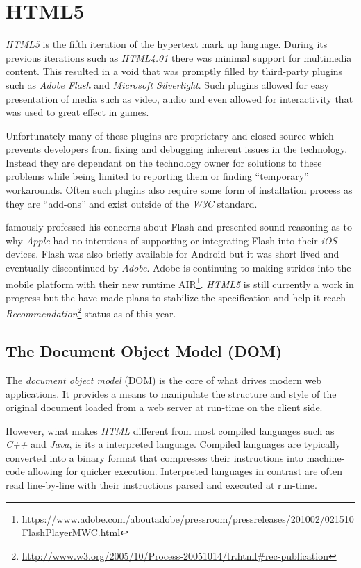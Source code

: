 \documentclass[final]{cmpreport}
\begin{document}
\section{HTML5}
\textit{HTML5} is the fifth iteration of the hypertext mark up language. During its previous iterations such as \textit{HTML4.01} there was minimal support for multimedia content. This resulted in a void that was promptly filled by third-party plugins such as \textit{Adobe Flash} and \textit{Microsoft Silverlight}. Such plugins allowed for easy presentation of media such as video, audio and even allowed for interactivity that was used to great effect in games.

Unfortunately many of these plugins are proprietary and closed-source which prevents developers from fixing and debugging inherent issues in the technology. Instead they are dependant on the technology owner for solutions to these problems while being limited to reporting them or finding ``temporary'' workarounds. Often such plugins also require some form of installation process as they are ``add-ons'' and exist outside of the \textit{W3C} standard. 

\citet{Jobs} famously professed his concerns about Flash and presented sound reasoning as to why \textit{Apple} had no intentions of supporting or integrating Flash into their \textit{iOS} devices. Flash was also briefly available for Android but it was short lived and eventually discontinued by \textit{Adobe}. Adobe is continuing to making strides into the mobile platform with their new runtime AIR\footnote{\url{https://www.adobe.com/aboutadobe/pressroom/pressreleases/201002/021510FlashPlayerMWC.html}}. \textit{HTML5} is still currently a work in progress but the \citet{W3C} have made plans to stabilize the specification and help it reach \textit{Recommendation}\footnote{\url{http://www.w3.org/2005/10/Process-20051014/tr.html\#rec-publication}} status as of this year.

\subsection{The Document Object Model (DOM)}
The \textit{document object model} (DOM) is the core of what drives modern web applications. It provides a means to manipulate the structure and style of the original document loaded from a web server at run-time on the client side.

However, what makes \textit{HTML} different from most compiled languages such as \textit{C++} and \textit{Java}, is its a interpreted language. Compiled languages are typically converted into a binary format that compresses their instructions into machine-code allowing for quicker execution. Interpreted languages in contrast are often read line-by-line with their instructions parsed and executed at run-time.
\end{document}
